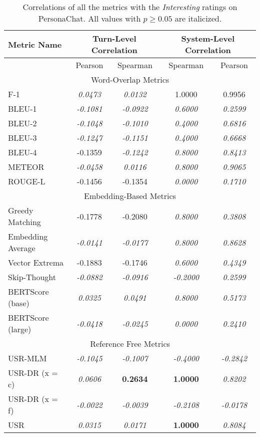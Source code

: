 \documentclass[11pt,a4paper]{article}
\begin{document}
\begin{table*}
    \centering
    \renewcommand*{\arraystretch}{1.2}
    \begin{tabular}{|l|c|c|c|c|}
    \hline
        \textbf{Metric Name} & \multicolumn{2}{|c|}{\textbf{Turn-Level Correlation}} & \multicolumn{2}{|c|}{\textbf{System-Level Correlation}}  \\ \hline
         & Pearson & Spearman & Spearman & Pearson \\ \hline
         \multicolumn{5}{|c|}{Word-Overlap Metrics} \\ \hline
F-1 & \textit{0.0473} & \textit{0.0132} & 1.0000 & 0.9956 \\
BLEU-1 & \textit{-0.1081} & \textit{-0.0922} & \textit{0.6000} & \textit{0.2599} \\
BLEU-2 & \textit{-0.1048} & \textit{-0.1010} & \textit{0.4000} & \textit{0.6816} \\
BLEU-3 & \textit{-0.1247} & \textit{-0.1151} & \textit{0.4000} & \textit{0.6668} \\
BLEU-4 & -0.1359 & \textit{-0.1242} & \textit{0.8000} & \textit{0.8413} \\
METEOR & \textit{-0.0458} & \textit{0.0116} & \textit{0.8000} & \textit{0.9065} \\
ROUGE-L & -0.1456 & -0.1354 & \textit{0.0000} & \textit{0.1710} \\\hline 
 \multicolumn{5}{|c|}{Embedding-Based Metrics} \\ \hline
Greedy Matching & -0.1778 & -0.2080 & \textit{0.8000} & \textit{0.3808} \\
Embedding Average & \textit{-0.0141} & \textit{-0.0177} & \textit{0.8000} & \textit{0.8628} \\
Vector Extrema & -0.1883 & -0.1746 & \textit{0.6000} & \textit{0.4349} \\
Skip-Thought & \textit{-0.0882} & \textit{-0.0916} & \textit{-0.2000} & \textit{0.2599} \\
BERTScore (base) & \textit{0.0325} & \textit{0.0491} & \textit{0.8000} & \textit{0.5173} \\
BERTScore (large) & \textit{-0.0418} & \textit{-0.0245} & \textit{0.0000} & \textit{0.2410} \\\hline 
 \multicolumn{5}{|c|}{Reference Free Metrics} \\ \hline
USR-MLM & \textit{-0.1045} & \textit{-0.1007} & \textit{-0.4000} & \textit{-0.2842} \\
USR-DR (x = c) & \textit{0.0606} & \textbf{0.2634} & \textbf{1.0000} & \textit{0.8202} \\
USR-DR (x = f) & \textit{-0.0022} & \textit{-0.0039} & \textit{-0.2108} & \textit{-0.0178} \\
USR & \textit{0.0315} & \textit{0.0171} & \textbf{1.0000} & \textit{0.8084} \\  \hline
    \end{tabular}
    \caption{Correlations of all the metrics with the \textit{Interesting} ratings on PersonaChat. All values with $p \geq 0.05$ are italicized.}
    
\end{table*}
\end{document}
